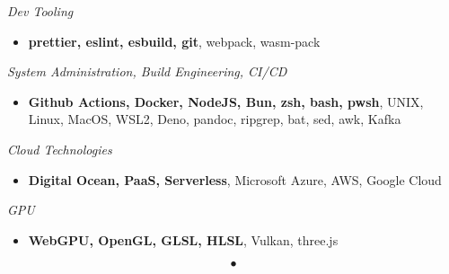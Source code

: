 \documentclass[10pt]{res}
\begin{document}
\begin{resume}
		\vspace{4pt}
		{\sl Dev Tooling}
		\begin{itemize}
			\item[] \textbf{prettier, eslint, esbuild, git}, webpack, wasm-pack
		\end{itemize}

		\vspace{4pt}
		{\sl System Administration, Build Engineering, CI/CD}
		\begin{itemize}
			\item[] \textbf{Github Actions, Docker, NodeJS, Bun, zsh, bash, pwsh}, UNIX,
				Linux, MacOS, WSL2, Deno, pandoc, ripgrep, bat, sed, awk, Kafka
		\end{itemize}

		\vspace{4pt}
		{\sl Cloud Technologies}
		\begin{itemize}
			\item[] \textbf{Digital Ocean, PaaS, Serverless}, Microsoft Azure, AWS, Google
				Cloud
		\end{itemize}

		\vspace{4pt}
		{\sl GPU}
		\begin{itemize}
			\item[] \textbf{WebGPU, OpenGL, GLSL, HLSL}, Vulkan, three.js
		\end{itemize}

		\[
			\bullet
		\]
	\end{resume}
\end{document}
